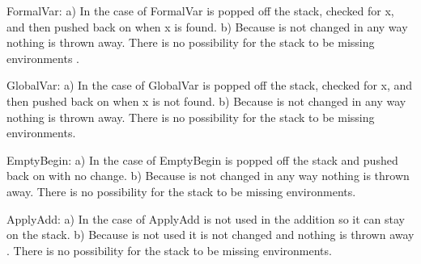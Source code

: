 \documentclass{book}
\begin{document}
\begin{mdP}[class={indent},data-line={118}]%
{}FormalVar: a) In the case of FormalVar %
{}\mdSpan[class={math-inline},elem={math-inline}]{$\rho$}%
{} is popped off the stack, checked for x, 
and then pushed back on when x is found. b) Because %
{}\mdSpan[class={math-inline},elem={math-inline}]{$\rho$}%
{} is not changed in any way 
nothing is thrown away. There is no possibility for the stack to be missing environments
.%
\end{mdP}%
\begin{mdP}[class={indent},data-line={123}]%
{}GlobalVar: a) In the case of GlobalVar %
{}\mdSpan[class={math-inline},elem={math-inline}]{$\rho$}%
{} is popped off the stack, checked for x, 
and then pushed back on when x is not found. b) Because %
{}\mdSpan[class={math-inline},elem={math-inline}]{$\rho$}%
{} is not changed in any 
way nothing is thrown away. There is no possibility for the stack to be missing 
environments.%
\end{mdP}%
\begin{mdP}[class={indent},data-line={128}]%
{}EmptyBegin: a) In the case of EmptyBegin %
{}\mdSpan[class={math-inline},elem={math-inline}]{$\rho$}%
{} is popped off the stack and pushed back 
on with no change. b) Because %
{}\mdSpan[class={math-inline},elem={math-inline}]{$\rho$}%
{} is not changed in any way nothing is thrown away. 
There is no possibility for the stack to be missing environments.%
\end{mdP}%
\begin{mdP}[class={indent},data-line={132}]%
{}ApplyAdd: a) In the case of ApplyAdd %
{}\mdSpan[class={math-inline},elem={math-inline}]{$\rho$}%
{} is not used in the addition so it can stay 
on the stack. b) Because %
{}\mdSpan[class={math-inline},elem={math-inline}]{$\rho$}%
{} is not used it is not changed and nothing is thrown away
. There is no possibility for the stack to be missing environments.%
\end{mdP}%
\end{document}
